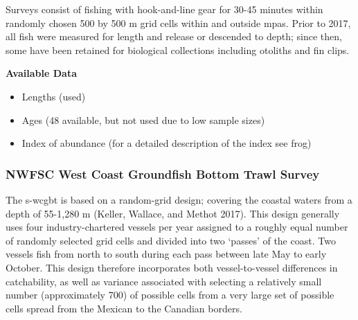 \documentclass[11pt,
  english,
  a4paper,
]{article}
\begin{document}
Surveys consist of fishing with hook-and-line gear for 30-45 minutes within randomly chosen 500 by 500 m grid cells within and outside \Gls{mpa}s. Prior to 2017, all fish were measured for length and release or descended to depth; since then, some have been retained for biological collections including otoliths and fin clips.

\textbf{Available Data}


\begin{itemize}
\item

  Lengths (used)

  \tagmcend\tagstructend\tagstructend
\item

  Ages (48 available, but not used due to low sample sizes)

  \tagmcend\tagstructend\tagstructend
\item

  Index of abundance (for a detailed description of the index see frog)

  \tagmcend\tagstructend\tagstructend
\end{itemize}

\tagstructend


\hypertarget{nwfsc-west-coast-groundfish-bottom-trawl-survey}{%
\subsubsection{NWFSC West Coast Groundfish Bottom Trawl Survey}\label{nwfsc-west-coast-groundfish-bottom-trawl-survey}}

\leavevmode\tagmcend\tagstructend

The \Gls{s-wcgbt} is based on a random-grid design; covering the coastal waters from a depth of 55-1,280 m {(Keller, Wallace, and Methot 2017)\leavevmode\tagmcend\tagstructend}. This design generally uses four industry-chartered vessels per year assigned to a roughly equal number of randomly selected grid cells and divided into two `passes' of the coast. Two vessels fish from north to south during each pass between late May to early October. This design therefore incorporates both vessel-to-vessel differences in catchability, as well as variance associated with selecting a relatively small number (approximately 700) of possible cells from a very large set of possible cells spread from the Mexican to the Canadian borders.
\end{document}
